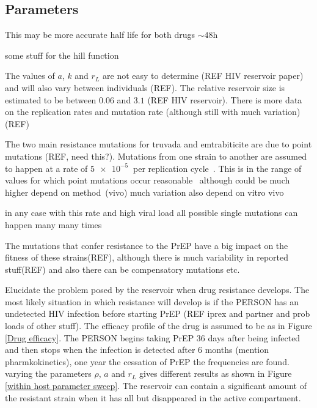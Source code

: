 \documentclass[DIV=15]{scrartcl}
\begin{document}
  
  
  
  
  
  
  \iffalse
  
  
  
\subsection{Parameters}
\label{Parameters}


 This may be more accurate half life for both drugs $\sim 48$h~\cite{patterson2011}
 
 

some stuff for the hill function~\cite{shirreff2011}
~\cite{hollingsworth2008}



The values of $a$, $k$ and $r_L$ are not easy to determine (REF HIV reservoir paper)
and will also vary between individuals (REF). The relative reservoir size is estimated to be between $0.06$ and $3.1$ (REF HIV reservoir). There is more data on the replication rates and mutation rate (although still with much variation) (REF)

The two main resistance mutations for truvada and emtrabiticite are due to point mutations (REF, need this?). Mutations from one strain to another are assumed to happen at a rate of $\SI{5e-5}{}$ per replication cycle~\cite{gao2004}. This is in the range of values for which point mutations occur reasonable~\cite{abram2010}
although could be much higher depend on method~\cite{cuevas2015}(vivo) much variation also depend on vitro vivo

in any case with this rate  and high viral load all possible single mutations can happen many many times~\cite{coffin1995}

The mutations that confer resistance to the PrEP have a big impact on the fitness of these strains(REF), although there is much variability in reported stuff(REF) and also there can be compensatory mutations etc.


Elucidate the problem posed by the reservoir when drug resistance develops. The  most likely situation in which resistance will develop is  if  the PERSON has an undetected HIV infection before starting PrEP (REF iprex and partner and prob loads of  other stuff). The efficacy profile of the drug is assumed to be as in Figure \ref{Drug efficacy}. The PERSON begins taking PrEP $36$ days after being infected and then stops when the infection is detected after $6$ months (mention pharmkokinetics), one year the cessation  of PrEP the frequencies are found. varying the parameters $\rho$, $a$ and $r_L$ 
gives different results as shown in Figure \ref{within host parameter sweep}. The reservoir can contain a significant amount of the resistant strain when it has all   but disappeared in the active compartment.
\end{document}
